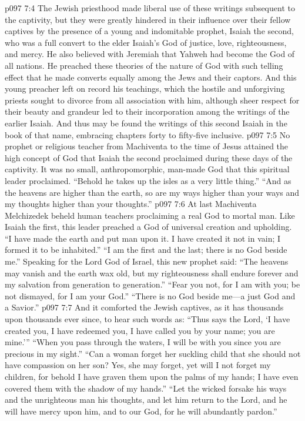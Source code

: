 \vs p097 7:4 The Jewish priesthood made liberal use of these writings subsequent to the captivity, but they were greatly hindered in their influence over their fellow captives by the presence of a young and indomitable prophet, Isaiah the second, who was a full convert to the elder Isaiah’s God of justice, love, righteousness, and mercy. He also believed with Jeremiah that Yahweh had become the God of all nations. He preached these theories of the nature of God with such telling effect that he made converts equally among the Jews and their captors. And this young preacher left on record his teachings, which the hostile and unforgiving priests sought to divorce from all association with him, although sheer respect for their beauty and grandeur led to their incorporation among the writings of the earlier Isaiah. And thus may be found the writings of this second Isaiah in the book of that name, embracing chapters forty to fifty\hyp{}five inclusive.
\pc \vs p097 7:5 No prophet or religious teacher from Machiventa to the time of Jesus attained the high concept of God that Isaiah the second proclaimed during these days of the captivity. It was no small, anthropomorphic, man\hyp{}made God that this spiritual leader proclaimed. “Behold he takes up the isles as a very little thing.” “And as the heavens are higher than the earth, so are my ways higher than your ways and my thoughts higher than your thoughts.”
\vs p097 7:6 At last Machiventa Melchizedek beheld human teachers proclaiming a real God to mortal man. Like Isaiah the first, this leader preached a God of universal creation and upholding. “I have made the earth and put man upon it. I have created it not in vain; I formed it to be inhabited.” “I am the first and the last; there is no God beside me.” Speaking for the Lord God of Israel, this new prophet said: “The heavens may vanish and the earth wax old, but my righteousness shall endure forever and my salvation from generation to generation.” “Fear you not, for I am with you; be not dismayed, for I am your God.” “There is no God beside me---a just God and a Savior.”
\vs p097 7:7 And it comforted the Jewish captives, as it has thousands upon thousands ever since, to hear such words as: “Thus says the Lord, ‘I have created you, I have redeemed you, I have called you by your name; you are mine.’” “When you pass through the waters, I will be with you since you are precious in my sight.” “Can a woman forget her suckling child that she should not have compassion on her son? Yes, she may forget, yet will I not forget my children, for behold I have graven them upon the palms of my hands; I have even covered them with the shadow of my hands.” “Let the wicked forsake his ways and the unrighteous man his thoughts, and let him return to the Lord, and he will have mercy upon him, and to our God, for he will abundantly pardon.”
